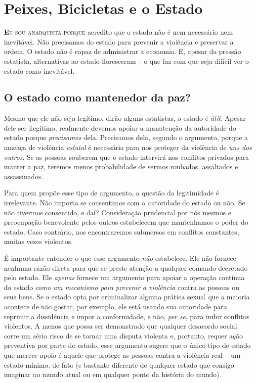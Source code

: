 
\chapter{Peixes, Bicicletas e o Estado}
\label{chap:2}

\lettrine[lines=2]{\textcolor{LettrineColor}{\textbf{E}}}{u sou anarquista porque} acredito que o estado não é nem necessário nem inevitável. Não precisamos do estado para prevenir a violência e preservar a ordem. O estado não é capaz de administrar a economia. E, apesar da pressão estatista, alternativas ao estado floresceram -- o que faz com que seja difícil ver o estado como inevitável.

\section{O estado como mantenedor da paz?}

Mesmo que ele não seja legítimo, dirão alguns estatistas, o estado é \emph{útil}. Apesar dele ser ilegítimo, realmente devemos apoiar a manutenção da autoridade do estado porque \emph{precisamos} dela. Precisamos dela, segundo o argumento, porque a ameaça de violência \emph{estatal} é necessária para nos proteger da violência de \emph{uns dos outros}. Se as pessoas souberem que o estado intervirá nos conflitos privados para manter a paz, teremos menos probabilidade de sermos roubados, assaltados e assassinados.

Para quem propõe esse tipo de argumento, a questão da legitimidade é irrelevante. Não importa se consentimos com a autoridade do estado ou não. Se não tivermos consentido, e daí? Consideração prudencial por nós mesmos e preocupação benevolente pelos outros estabelecem que mantenhamos o poder do estado. Caso contrário, nos encontraremos submersos em conflitos constantes, muitas vezes violentos.

É importante entender o que esse argumento \emph{não} estabelece. Ele não fornece nenhuma razão direta para que se preste atenção a qualquer comando decretado pelo estado. Ele \emph{apenas} fornece um argumento para apoiar a operação contínua do estado \emph{como um mecanismo para prevenir a violência} contra as pessoas ou seus bens. Se o estado opta por criminalizar alguma prática sexual que a maioria acontece de não gostar, por exemplo, ele está usando sua autoridade para reprimir a dissidência e impor a conformidade, e não, \emph{per se}, para inibir conflitos violentos. A menos que possa ser demonstrado que qualquer desacordo social corre um sério risco de se tornar uma disputa violenta e, portanto, requer ação preventiva por parte do estado, esse argumento sugere que o único tipo de estado que merece apoio é aquele que protege as pessoas contra a violência real -- um estado mínimo, de fato (e bastante diferente de qualquer estado que consigo imaginar no mundo atual ou em qualquer ponto da história do mundo).

